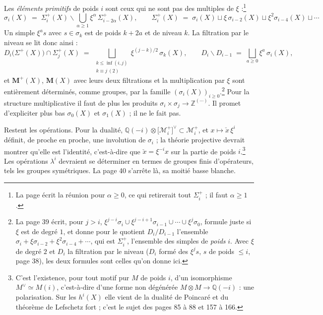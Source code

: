\documentclass[11pt,a4paper]{article}
\begin{document}
Les \emph{éléments primitifs} de poids $i$ sont ceux qui ne sont pas des
multiples de $\xi$ :\footnote{La page écrit la réunion pour
$\alpha \geqslant 0$, ce qui retirerait tout $\Sigma^{+}_{i}$ ; il faut
$\alpha \geqslant 1$.}
\[
\sigma_{i}(X) \;=\; \Sigma^{+}_{i}(X) \smallsetminus \bigcup_{\alpha \geqslant 1}
\xi^{\alpha}\,\Sigma^{+}_{i-2\alpha}(X) ,
\qquad
\Sigma^{+}_{i}(X) \;=\; \sigma_{i}(X) \sqcup \xi\,\sigma_{i-2}(X) \sqcup
\xi^{2}\sigma_{i-4}(X) \sqcup \cdots
\]
Un simple $\xi^{a}s$ avec $s \in \sigma_{k}$ est de poids $k + 2a$ et de niveau
$k$. La filtration par le niveau se lit donc ainsi :
\[
D_{i}\bigl(\Sigma^{+}(X)\bigr) \cap \Sigma^{+}_{j}(X) \;=\;
\bigsqcup_{\substack{k \leqslant \inf(i,j) \\ k \equiv j \ (2)}}
\xi^{(j-k)/2}\,\sigma_{k}(X) ,
\qquad
D_{i} \smallsetminus D_{i-1} \;=\; \bigsqcup_{a \geqslant 0} \xi^{a}\,\sigma_{i}(X) ,
\]
et $\mathbf{M}^{+}(X)$, $\mathbf{M}(X)$ avec leurs deux filtrations et la
multiplication par $\xi$ sont entièrement déterminés, comme groupes, par la famille
$(\sigma_{i}(X))_{i \geqslant 0}$.\footnote{La page 39 écrit, pour $j > i$,
$\xi^{j-i}\sigma_{i} \cup \xi^{j-i+1}\sigma_{i-1} \cup \cdots \cup \xi^{j}\sigma_{0}$,
formule juste si $\xi$ est de degré $1$, et donne pour le quotient
$D_{i}/D_{i-1}$ l'ensemble $\sigma_{i} + \xi\sigma_{i-2} + \xi^{2}\sigma_{i-4} +
\cdots$, qui est $\Sigma^{+}_{i}$, l'ensemble des simples de \emph{poids} $i$.
Avec $\xi$ de degré $2$ et $D_{i}$ la filtration par le niveau ($D_{i}$ formé des
$\xi^{j}s$, $s$ de poids $\leqslant i$, page 38), les deux formules sont celles
qu'on donne ici.} Pour la structure multiplicative il faut de plus les produits
$\sigma_{i} \times \sigma_{j} \to \mathbb{Z}^{(\cdots)}$. Il promet d'expliciter
plus bas $\sigma_{0}(X)$ et $\sigma_{1}(X)$ ; il ne le fait pas.

Restent les opérations. Pour la dualité, $\mathbb{Q}(-i) \otimes
\bigl[\mathcal{M}^{+}_{i}\bigr]^{\vee} \subset \mathcal{M}^{+}_{i}$, et $x \mapsto
\check{x}\,\xi^{i}$ définit, de proche en proche, une involution de
$\sigma_{i}$ ; la théorie projective devrait montrer qu'elle est l'identité, c'est-à-dire que $\check{x} = \xi^{-i}x$ sur la
partie de poids $i$.\footnote{C'est l'existence, pour tout motif pur $M$ de poids
$i$, d'un isomorphisme $M^{\vee} \simeq M(i)$, c'est-à-dire d'une forme non
dégénérée $M \otimes M \to \mathbb{Q}(-i)$ : une polarisation. Sur les $h^{i}(X)$
elle vient de la dualité de Poincaré et du théorème de Lefschetz fort ; c'est
le sujet des pages 85 à 88 et 157 à 166.} Les opérations $\lambda^{i}$ devraient
se déterminer en termes de groupes finis d'opérateurs, tels les groupes
symétriques. La page 40 s'arrête là, sa moitié basse blanche.
\end{document}
